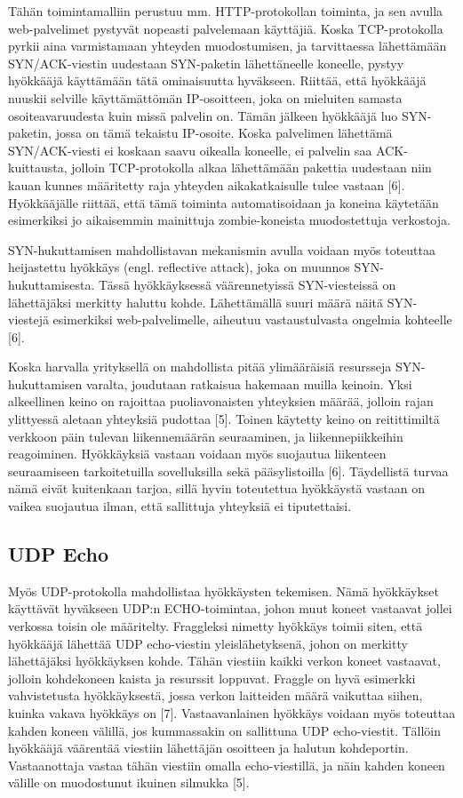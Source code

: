 Tähän toimintamalliin perustuu mm. HTTP-protokollan toiminta, ja sen
avulla web-palvelimet pystyvät nopeasti palvelemaan käyttäjiä. Koska
TCP-protokolla pyrkii aina varmistamaan yhteyden muodostumisen, ja
tarvittaessa lähettämään SYN/ACK-viestin uudestaan SYN-paketin
lähettäneelle koneelle, pystyy hyökkääjä käyttämään tätä ominaisuutta
hyväkseen. Riittää, että hyökkääjä nuuskii selville käyttämättömän
IP-osoitteen, joka on mieluiten samasta osoiteavaruudesta kuin missä
palvelin on. Tämän jälkeen hyökkääjä luo SYN-paketin, jossa on tämä
tekaistu IP-osoite. Koska palvelimen lähettämä SYN/ACK-viesti ei
koskaan saavu oikealla koneelle, ei palvelin saa ACK-kuittausta,
jolloin TCP-protokolla alkaa lähettämään pakettia uudestaan niin kauan
kunnes määritetty raja yhteyden aikakatkaisulle tulee vastaan
[6]. Hyökkääjälle riittää, että tämä toiminta automatisoidaan ja
koneina käytetään esimerkiksi jo aikaisemmin mainittuja
zombie-koneista muodostettuja verkostoja.

SYN-hukuttamisen mahdollistavan mekanismin avulla voidaan myös
toteuttaa heijastettu hyökkäys (engl. reflective attack), joka on
muunnos SYN-hukuttamisesta. Tässä hyökkäyksessä väärennetyissä
SYN-viesteissä on lähettäjäksi merkitty haluttu kohde. Lähettämällä
suuri määrä näitä SYN-viestejä esimerkiksi web-palvelimelle, aiheutuu
vastaustulvasta ongelmia kohteelle [6].

Koska harvalla yrityksellä on mahdollista pitää ylimääräisiä
resursseja SYN-hu\-kut\-ta\-mi\-sen varalta, joudutaan ratkaisua hakemaan
muilla keinoin. Yksi alkeellinen keino on rajoittaa puoliavonaisten
yhteyksien määrää, jolloin rajan ylittyessä aletaan yhteyksiä pudottaa
[5]. Toinen käytetty keino on reitittimiltä verkkoon päin tulevan
liikennemäärän seuraaminen, ja liikennepiikkeihin
reagoiminen. Hyökkäyksiä vastaan voidaan myös suojautua liikenteen
seuraamiseen tarkoitetuilla sovelluksilla sekä pääsylistoilla
[6]. Täydellistä turvaa nämä eivät kuitenkaan tarjoa, sillä hyvin
toteutettua hyökkäystä vastaan on vaikea suojautua ilman, että
sallittuja yhteyksiä ei tiputettaisi.

\subsection{UDP Echo}

Myös UDP-protokolla mahdollistaa hyökkäysten tekemisen. Nämä
hyökkäykset käyttävät hyväkseen UDP:n ECHO-toimintaa, johon muut
koneet vastaavat jollei verkossa toisin ole määritelty. Fraggleksi
nimetty hyökkäys toimii siten, että hyökkääjä lähettää UDP
echo-viestin yleislähetyksenä, johon on merkitty lähettäjäksi
hyökkäyksen kohde. Tähän viestiin kaikki verkon koneet vastaavat,
jolloin kohdekoneen kaista ja resurssit loppuvat. Fraggle on hyvä
esimerkki vahvistetusta hyökkäyksestä, jossa verkon laitteiden määrä
vaikuttaa siihen, kuinka vakava hyökkäys on [7]. Vastaavanlainen
hyökkäys voidaan myös toteuttaa kahden koneen välillä, jos kummassakin
on sallittuna UDP echo-viestit. Tällöin hyökkääjä väärentää viestiin
lähettäjän osoitteen ja halutun kohdeportin. Vastaanottaja vastaa
tähän viestiin omalla echo-viestillä, ja näin kahden koneen välille on
muodostunut ikuinen silmukka [5].

